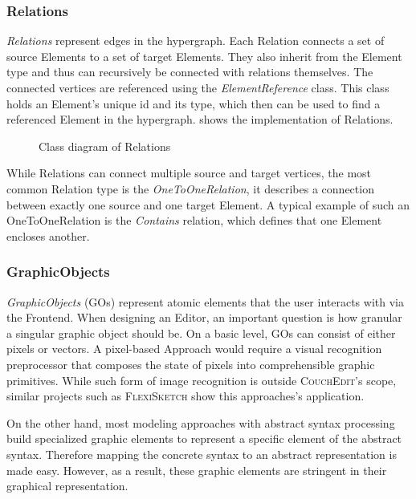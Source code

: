 
\subsubsection{Relations}
\emph{Relations} represent edges in the hypergraph. Each Relation connects a set of source Elements to a set of target Elements. They also inherit from the Element type and thus can recursively be connected with relations themselves. The connected vertices are referenced using the \emph{ElementReference} class. This class holds an Element's unique id and its type, which then can be used to find a referenced Element in the hypergraph.  shows the implementation of Relations. 

\begin{figure}[ht]
  \centering
  
  \caption{Class diagram of Relations}
  \label{fig:relations}
\end{figure}

 While Relations can connect multiple source and target vertices, the most common Relation type is the \emph{OneToOneRelation}, it describes a connection between exactly one source and one target Element. A typical example of such an OneToOneRelation is the \emph{Contains} relation, which defines that one Element encloses another.  


\subsubsection{GraphicObjects}
\emph{GraphicObjects} (GOs) represent atomic elements that the user interacts with via the Frontend. When designing an Editor, an important question is how granular a singular graphic object should be. On a basic level, GOs can consist of either pixels or vectors. A pixel-based Approach would require a visual recognition preprocessor that composes the state of pixels into comprehensible graphic primitives. While such form of image recognition is outside \textsc{CouchEdit}'s scope, similar projects such as \textsc{FlexiSketch} \cite{wuest_flexisketch_2015} show this approaches's application.

On the other hand, most modeling approaches with abstract syntax processing build specialized graphic elements to represent a specific element of the abstract syntax. Therefore mapping the concrete syntax to an abstract representation is made easy. However, as a result, these graphic elements are stringent in their graphical representation.

